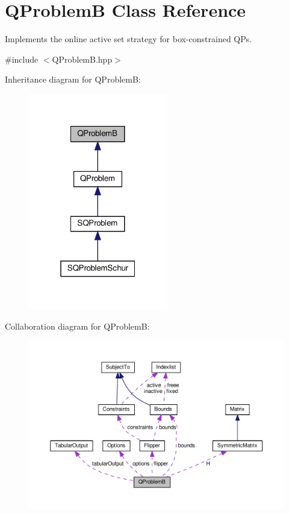 \hypertarget{class_q_problem_b}{}\section{Q\+ProblemB Class Reference}
\label{class_q_problem_b}


Implements the online active set strategy for box-\/constrained Q\+Ps.  




{\ttfamily \#include $<$Q\+Problem\+B.\+hpp$>$}



Inheritance diagram for Q\+ProblemB\+:
\nopagebreak
\begin{figure}[H]
\begin{center}
\leavevmode
\includegraphics[width=172pt]{class_q_problem_b__inherit__graph}
\end{center}
\end{figure}


Collaboration diagram for Q\+ProblemB\+:
\nopagebreak
\begin{figure}[H]
\begin{center}
\leavevmode
\includegraphics[width=350pt]{class_q_problem_b__coll__graph}
\end{center}
\end{figure}
